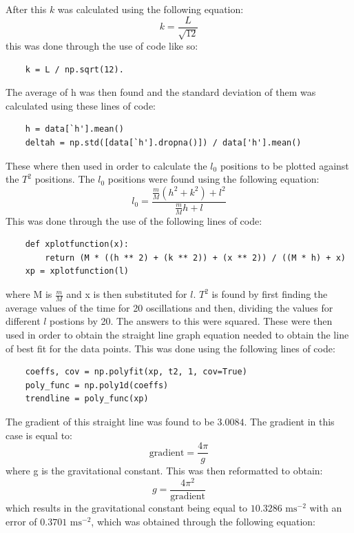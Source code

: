 \documentclass[12pt, a4paper]{article}
\begin{document}
After this $k$ was calculated using the following equation:
\begin{equation}\label{eqn: k equation}
    k = \frac{L}{\sqrt{12}}
\end{equation}
this was done through the use of code like so:
\begin{verbatim}
    k = L / np.sqrt(12).
\end{verbatim}
The average of h was then found and the standard deviation of them was calculated using these lines of code:
\begin{verbatim}
    h = data[`h'].mean()
    deltah = np.std([data[`h'].dropna()]) / data['h'].mean()
\end{verbatim}
These where then used in order to calculate the $l_0$ positions to be plotted against the $T^2$ positions. The $l_0$ positions were found using the following equation:
\begin{equation}\label{eqn: l0 equation}
    l_0 = \frac{\frac{m}{M}(h^2 + k^2) + l^2}{\frac{m}{M}h + l}
\end{equation}
This was done through the use of the following lines of code:
\begin{verbatim}
    def xplotfunction(x):
        return (M * ((h ** 2) + (k ** 2)) + (x ** 2)) / ((M * h) + x)
    xp = xplotfunction(l)
\end{verbatim}
where M is $\frac{m}{M}$ and x is then substituted for $l$. $T^2$ is found by first finding the average values of the time for 20 oscillations and then, dividing the values for different $l$ postions by 20. The answers to this were squared. These were then used in order to obtain the straight line graph equation needed to obtain the line of best fit for the data points. This was done using the following lines of code:
\begin{verbatim}
    coeffs, cov = np.polyfit(xp, t2, 1, cov=True)
    poly_func = np.poly1d(coeffs)
    trendline = poly_func(xp)
\end{verbatim}
The gradient of this straight line was found to be $3.0084$. The gradient in this case is equal to:
\begin{equation}\label{eqn: gradient g}
    \text{gradient} = \frac{4\pi}{g} 
\end{equation}
where g is the gravitational constant. This was then reformatted to obtain:
\begin{equation}\label{eqn: grav equation}
    g = \frac{4\pi ^2}{\text{gradient}}
\end{equation}
which results in the gravitational constant being equal to $10.3286\text{ ms}^{-2}$ with an error of $0.3701\text{ ms}^{-2}$, which was obtained through the following equation:
\end{document}
